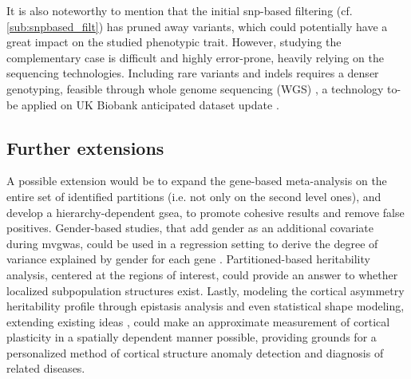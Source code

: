 It is also noteworthy to mention that the initial \ac{snp}-based filtering (cf. \autoref{sub:snpbased_filt}) has pruned away variants, which could potentially have a great impact on the studied phenotypic trait. However, studying the complementary case is difficult and highly error-prone, heavily relying on the sequencing technologies. Including rare variants and indels requires a denser genotyping, feasible through whole genome sequencing (WGS) \cite{Kierczak2022,Cirulli2020}, a technology to-be applied on UK Biobank anticipated dataset update \cite{Halldorsson2022}.


\subsection{Further extensions}
A possible extension would be to expand the gene-based meta-analysis on the entire set of identified partitions (i.e. not only on the second level ones), and develop a hierarchy-dependent \ac{gsea}, to promote cohesive results and remove false positives. Gender-based studies, that add gender as an additional covariate during  \ac{mvgwas}, could be used in a regression setting to derive the degree of variance explained by gender for each gene \cite{Rawlik2016}. Partitioned-based heritability analysis, centered at the regions of interest, could provide an answer to whether localized subpopulation structures exist. Lastly, modeling the cortical asymmetry heritability profile through epistasis analysis and even statistical shape modeling, extending existing ideas \cite{Filipe2019,Claes2014,White2020}, could make an approximate measurement of cortical plasticity in a spatially dependent manner possible, providing grounds for a personalized method of cortical structure anomaly detection and diagnosis of related diseases.


